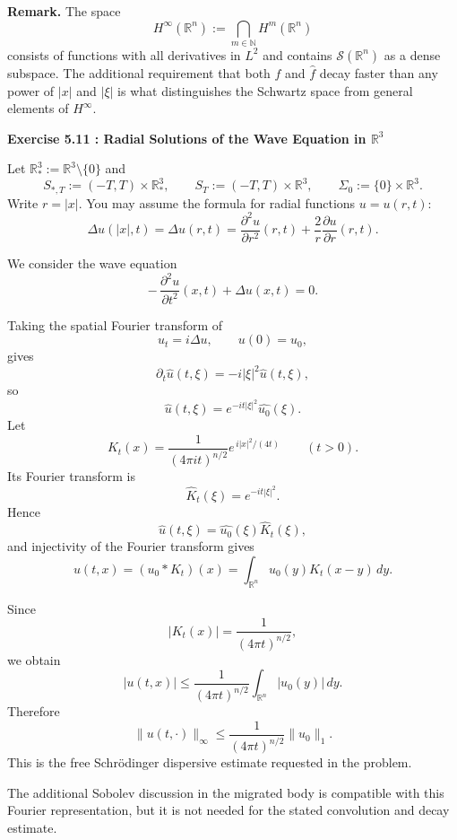 \begin{problem}[CP-III-0019]
\par\smallskip\noindent\textbf{Remark.}\quad
The space
\[
H^\infty(\mathbb{R}^n)
:= \bigcap_{m\in\mathbb{N}} H^m(\mathbb{R}^n)
\]
consists of functions with all derivatives in $L^2$ and contains
$\mathscr{S}(\mathbb{R}^n)$ as a dense subspace. The additional
requirement that both $f$ and $\widehat{f}$ decay faster than any power
of $|x|$ and $|\xi|$ is what distinguishes the Schwartz space from
general elements of $H^\infty$.


\par\medskip\noindent\textbf{Exercise 5.11 : Radial Solutions of the Wave Equation in $\mathbb{R}^3$}\quad

Let $\mathbb{R}^3_* := \mathbb{R}^3\setminus\{0\}$ and
\[
S_{*,T} := (-T,T)\times\mathbb{R}^3_*,
\qquad
S_T := (-T,T)\times\mathbb{R}^3,
\qquad
\Sigma_0 := \{0\}\times\mathbb{R}^3.
\]
Write $r = |x|$. You may assume the formula for radial functions
$u=u(r,t)$:
\[
\Delta u(|x|,t) = \Delta u(r,t)
= \frac{\partial^2 u}{\partial r^2}(r,t)
+ \frac{2}{r}\frac{\partial u}{\partial r}(r,t).
\]

We consider the wave equation
\[
-\,\frac{\partial^2 u}{\partial t^2}(x,t)
+ \Delta u(x,t) = 0.
\]

\end{problem}

\begin{solution}
Taking the spatial Fourier transform of
\[
u_t=i\Delta u,
\qquad
u(0)=u_0,
\]
gives
\[
\partial_t\widehat u(t,\xi)
=
-i|\xi|^2\widehat u(t,\xi),
\]
so
\[
\widehat u(t,\xi)
=
e^{-it|\xi|^2}\widehat{u_0}(\xi).
\]
Let
\[
K_t(x)
=
\frac1{(4\pi it)^{n/2}}
e^{\,i|x|^2/(4t)}
\qquad(t>0).
\]
Its Fourier transform is
\[
\widehat K_t(\xi)=e^{-it|\xi|^2}.
\]
Hence
\[
\widehat u(t,\xi)
=
\widehat{u_0}(\xi)\widehat K_t(\xi),
\]
and injectivity of the Fourier transform gives
\[
\boxed{
u(t,x)
=
(u_0*K_t)(x)
=
\int_{\mathbb R^n}u_0(y)K_t(x-y)\,dy.
}
\]

Since
\[
|K_t(x)|
=
\frac1{(4\pi t)^{n/2}},
\]
we obtain
\[
|u(t,x)|
\le
\frac1{(4\pi t)^{n/2}}
\int_{\mathbb R^n}|u_0(y)|\,dy.
\]
Therefore
\[
\boxed{
\|u(t,\cdot)\|_\infty
\le
\frac1{(4\pi t)^{n/2}}
\|u_0\|_1.
}
\]
This is the free Schrödinger dispersive estimate requested in the
problem.

The additional Sobolev discussion in the migrated body is compatible
with this Fourier representation, but it is not needed for the stated
convolution and decay estimate.
\end{solution}


